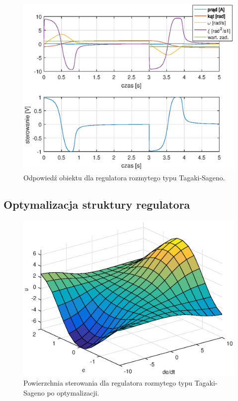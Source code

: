 \begin{figure}[h!]
	\centering
	\includegraphics[scale = 0.8]{fig/fuzzy_sagenoMan_odp.eps}
	\caption		
	{Odpowied\'z obiektu dla regulatora rozmytego typu Tagaki-Sageno.}
	\label{fuzzy_sageno_man}
\end{figure}
\FloatBarrier

\subsection{Optymalizacja struktury regulatora}
\begin{figure}[h!]
	\centering
	\includegraphics[scale = 0.8]{fig/sagenoOptSurface.eps}
	\caption		
	{Powierzchnia sterowania dla regulatora rozmytego typu Tagaki-Sageno po optymalizacji.}
	\label{fuzzy_sageno_sufrace}
\end{figure}

